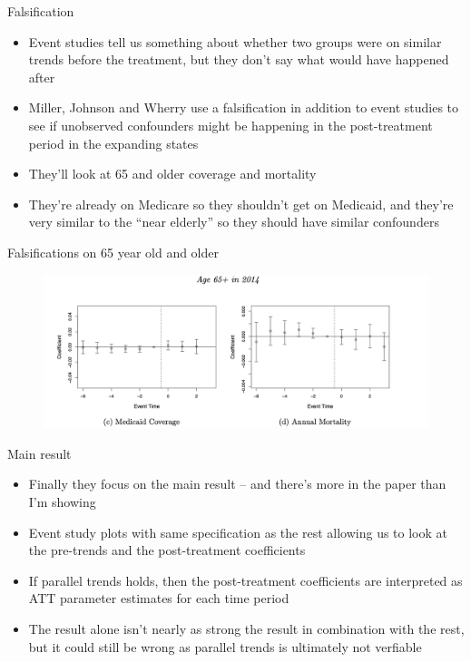 \documentclass{beamer}
\begin{document}
\begin{frame}{Falsification}

\begin{itemize}

\item Event studies tell us something about whether two groups were on similar trends before the treatment, but they don't say what would have happened after
\item Miller, Johnson and Wherry use a falsification in addition to event studies to see if unobserved confounders might be happening in the post-treatment period in the expanding states
\item They'll look at 65 and older coverage and mortality
\item They're already on Medicare so they shouldn't get on Medicaid, and they're very similar to the ``near elderly'' so they should have similar confounders
\end{itemize}

\end{frame}

\begin{frame}{Falsifications on 65 year old and older}

	\begin{figure}
\includegraphics[scale=0.425]{./lecture_includes/placebo_medicaid}
	\end{figure}

\end{frame}

\begin{frame}{Main result}

\begin{itemize}

\item Finally they focus on the main result -- and there's more in the paper than I'm showing
\item Event study plots with same specification as the rest allowing us to look at the pre-trends and the post-treatment coefficients
\item If parallel trends holds, then the post-treatment coefficients are interpreted as ATT parameter estimates for each time period
\item The result alone isn't nearly as strong the result in combination with the rest, but it could still be wrong as parallel trends is ultimately not verfiable
\end{itemize}

\end{frame}
\end{document}
